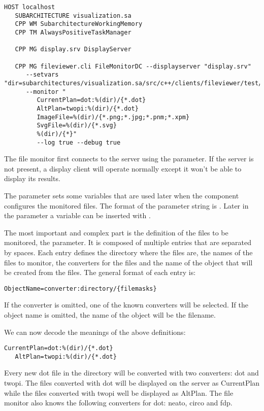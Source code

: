 \begin{Verbatim}[fontsize=\scriptsize,gobble=3]
   HOST localhost
   SUBARCHITECTURE visualization.sa 
   CPP WM SubarchitectureWorkingMemory
   CPP TM AlwaysPositiveTaskManager

   CPP MG display.srv DisplayServer

   CPP MG fileviewer.cli FileMonitorDC --displayserver "display.srv"
      --setvars "dir=subarchitectures/visualization.sa/src/c++/clients/fileviewer/test/xdata"
      --monitor "
         CurrentPlan=dot:%(dir)/{*.dot}
         AltPlan=twopi:%(dir)/{*.dot}
         ImageFile=%(dir)/{*.png;*.jpg;*.pnm;*.xpm}
         SvgFile=%(dir)/{*.svg}
         %(dir)/{*}"
         --log true --debug true
\end{Verbatim}

The file monitor first connects to the server using the 
parameter. If the server is not present, a display client will operate normally
except it won't be able to display its results.

The parameter  sets some variables that are used later when
the component configures the monitored files. The format of the parameter
string is . Later in the parameter
 a variable can be inserted with .

The most important and complex part is the definition of the files to be
monitored, the  parameter. It is composed of multiple entries
that are separated by spaces. Each entry defines the directory where the files
are, the names of the files to monitor, the converters for the files and the
name of the object that will be created from the files. The general format of
each entry is:
\begin{Verbatim}[fontsize=\scriptsize,gobble=3]
   ObjectName=converter:directory/{filemasks}
\end{Verbatim}

If the converter is omitted, one of the known converters will be selected.
If the object name is omitted, the name of the object will be the filename.

We can now decode the meanings of the above definitions:

\begin{Verbatim}[fontsize=\scriptsize,gobble=3]
   CurrentPlan=dot:%(dir)/{*.dot}
   AltPlan=twopi:%(dir)/{*.dot}
\end{Verbatim}

Every new dot file in the directory will be converted with two converters: dot
and twopi. The files converted with dot will be displayed on the server as
CurrentPlan while the files converted with twopi well be displayed as AltPlan.
The file monitor also knows the following converters for dot: neato, circo and
fdp.

